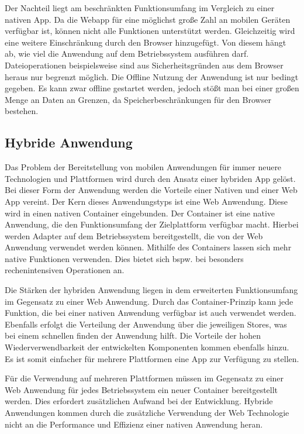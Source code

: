 Der Nachteil liegt am beschränkten Funktionsumfang im Vergleich zu einer nativen App. Da die Webapp für eine möglichst große Zahl an mobilen Geräten verfügbar ist, können nicht alle Funktionen unterstützt werden. Gleichzeitig wird eine weitere Einschränkung durch den Browser hinzugefügt. Von diesem hängt ab, wie viel die Anwendung auf dem Betriebssystem ausführen darf. Dateioperationen beispielsweise sind aus Sicherheitsgründen aus dem Browser heraus nur begrenzt möglich. Die Offline Nutzung der Anwendung ist nur bedingt gegeben. Es kann zwar offline gestartet werden, jedoch stößt man bei einer großen Menge an Daten an Grenzen, da Speicherbeschränkungen für den Browser bestehen.

\subsection{Hybride Anwendung} \label{hybridApplication}
Das Problem der Bereitstellung von mobilen Anwendungen für immer neuere Technologien und Plattformen wird durch den Ansatz einer hybriden App gelöst. Bei dieser Form der Anwendung werden die Vorteile einer Nativen und einer Web App vereint.  
Der Kern dieses Anwendungstyps ist eine Web Anwendung. Diese wird in einen nativen Container eingebunden.
Der Container ist eine native Anwendung, die den Funktionsumfang der Zielplattform verfügbar macht. Hierbei werden Adapter auf dem Betriebssystem bereitgestellt, die von der Web Anwendung verwendet werden können. Mithilfe des Containers lassen sich mehr native Funktionen verwenden. Dies bietet sich bspw. bei besonders rechenintensiven Operationen an.\par

Die Stärken der hybriden Anwendung liegen in dem erweiterten Funktionsumfang im Gegensatz zu einer Web Anwendung. Durch das Container-Prinzip kann jede Funktion, die bei einer nativen Anwendung verfügbar ist auch verwendet werden. Ebenfalls erfolgt die Verteilung der Anwendung über die jeweiligen Stores, was bei einem schnellen finden der Anwendung hilft. Die Vorteile der hohen Wiederverwendbarkeit der entwickelten Komponenten kommen ebenfalls hinzu. Es ist somit einfacher für mehrere Plattformen eine App zur Verfügung zu stellen. \par

Für die Verwendung auf mehreren Plattformen müssen im Gegensatz zu einer Web Anwendung für jedes Betriebssystem ein neuer Container bereitgestellt werden. Dies erfordert zusätzlichen Aufwand bei der Entwicklung. Hybride Anwendungen kommen durch die zusätzliche Verwendung der Web Technologie nicht an die Performance und Effizienz einer nativen Anwendung heran. 


